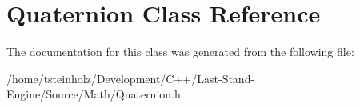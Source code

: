 \hypertarget{classQuaternion}{}\section{Quaternion Class Reference}
\label{classQuaternion}


The documentation for this class was generated from the following file\+:\begin{DoxyCompactItemize}
\item 
/home/tsteinholz/\+Development/\+C++/\+Last-\/\+Stand-\/\+Engine/\+Source/\+Math/Quaternion.\+h\end{DoxyCompactItemize}
